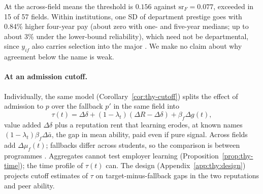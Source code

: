 At the across-field means the threshold is $0.156$ against
$\mathrm{sr}_F=0.077$, exceeded in 15 of 57 fields. Within institutions, one SD of department prestige goes with
0.84\% higher four-year pay  (about zero with one- and five-year medians; up to about 3\% under the
lower-bound reliability), which need not be departmental, since $y_{if}$ also carries selection into the major
\citep{bleemer2022will}. We make no claim about why agreement below the name is weak.

\paragraph{At an admission cutoff.} Individually, the same model (Corollary~\ref{cor:thy-cutoff}) splits the effect
of admission to $p$ over the fallback $p'$ in the same field into
\begin{equation}\label{eq:thy-cutoff}
\tau(t)=\Delta\delta+(1-\lambda_t)(\Delta R-\Delta\delta)+\beta_f\Delta g(t),
\end{equation}
value added $\Delta\delta$ plus a reputation rent that learning erodes, at known names
$(1-\lambda_t)\beta_f\Delta\bar a$, the gap in mean ability, paid even if pure signal. Across fields add
$\Delta\mu_f(t)$; fallbacks differ across students, so the comparison is between programmes
\citep{hastings2013some,kirkeboen2016field}. Aggregates cannot test employer learning
(Proposition~\ref{prop:thy-time}); the time profile of $\tau(t)$ can. The design (Appendix~\ref{app:thy:design})
projects cutoff estimates of $\tau$ on target-minus-fallback gaps in the two reputations and peer ability.

